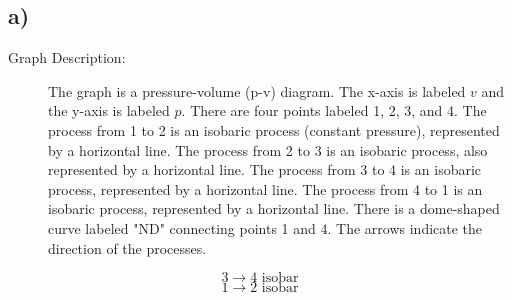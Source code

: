 

\subsection*{a)}

\begin{description}
    \item[Graph Description:] The graph is a pressure-volume (p-v) diagram. The x-axis is labeled \( v \) and the y-axis is labeled \( p \). There are four points labeled 1, 2, 3, and 4. The process from 1 to 2 is an isobaric process (constant pressure), represented by a horizontal line. The process from 2 to 3 is an isobaric process, also represented by a horizontal line. The process from 3 to 4 is an isobaric process, represented by a horizontal line. The process from 4 to 1 is an isobaric process, represented by a horizontal line. There is a dome-shaped curve labeled "ND" connecting points 1 and 4. The arrows indicate the direction of the processes.
\end{description}

\[
3 \rightarrow 4 \text{ isobar}
\]
\[
1 \rightarrow 2 \text{ isobar}
\]